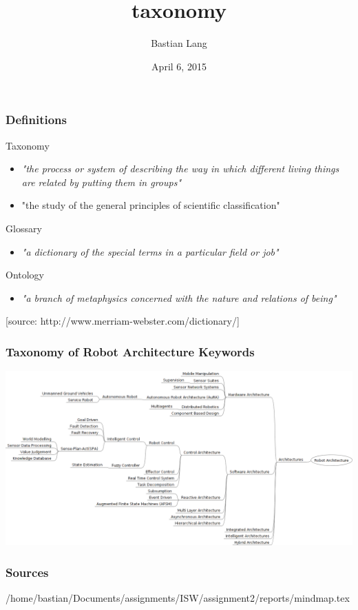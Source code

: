 \documentclass[8pt]{beamer}
\title[Taxonomy]{taxonomy} %
\author{Bastian Lang} %
\institute[BRSU] %
{
Master of Autonomous Systems \\ %
}
\date{April 6, 2015}
\begin{document}
\listoffigures
\begin{frame}
\titlepage 
\end{frame}

\begin{frame}
\frametitle{Definitions}
Taxonomy
\begin{itemize}
\item \emph{"the process or system of describing the way in which different living things are related by putting them in groups"}
\item "the study of the general principles of scientific classification"
\end{itemize}
Glossary
\begin{itemize}
\item \emph{"a dictionary of the special terms in a particular field or job"}
\end{itemize}
Ontology
\begin{itemize}
\item \emph{"a branch of metaphysics concerned with the nature and relations of being"}
\end{itemize}
\vspace{5mm}
[source: http://www.merriam-webster.com/dictionary/]
\end{frame}

\begin{frame}
\frametitle{Taxonomy of Robot Architecture Keywords}
\includegraphics[scale=0.25]{taxonomy.png}
\end{frame}

\begin{frame}
\frametitle{Sources}
/home/bastian/Documents/assignments/ISW/assignment2/reports/mindmap.tex
\end{frame}
\end{document}

